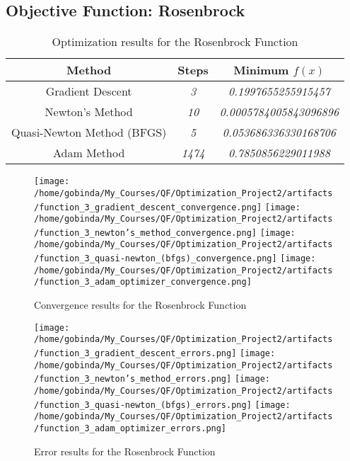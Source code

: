 \documentclass[12pt]{article}
\begin{document}
\subsection*{Objective Function: Rosenbrock}

\begin{table}[htbp]
   \centering
   \small %
   \begin{tabular}{|c|c|c|}
      \hline
      \textbf{Method} & \textbf{Steps} & \textbf{Minimum \( f(x) \)} \\
      \hline
      Gradient Descent & \textit{3} & \textit{0.1997655255915457} \\
      \hline
      Newton's Method & \textit{10} & \textit{0.0005784005843096896} \\
      \hline
      Quasi-Newton Method (BFGS) & \textit{5} & \textit{0.053686336330168706} \\
      \hline
      Adam Method & \textit{1474} & \textit{0.7850856229011988} \\
      \hline
   \end{tabular}
   \caption{\small Optimization results for the Rosenbrock Function}
   \label{tab:rosenbrock_function_results}
\end{table}

\begin{figure}[htbp]
   \centering
   \texttt{[image: /home/gobinda/My\_Courses/QF/Optimization\_Project2/artifacts/function\_3\_gradient\_descent\_convergence.png]}
   \texttt{[image: /home/gobinda/My\_Courses/QF/Optimization\_Project2/artifacts/function\_3\_newton's\_method\_convergence.png]}
   \texttt{[image: /home/gobinda/My\_Courses/QF/Optimization\_Project2/artifacts/function\_3\_quasi-newton\_(bfgs)\_convergence.png]}
   \texttt{[image: /home/gobinda/My\_Courses/QF/Optimization\_Project2/artifacts/function\_3\_adam\_optimizer\_convergence.png]}
   \caption{\small Convergence results for the Rosenbrock Function}
   \label{fig:rosenbrock_function_convergence}
\end{figure}

\begin{figure}[htbp]
   \centering
   \texttt{[image: /home/gobinda/My\_Courses/QF/Optimization\_Project2/artifacts/function\_3\_gradient\_descent\_errors.png]}
   \texttt{[image: /home/gobinda/My\_Courses/QF/Optimization\_Project2/artifacts/function\_3\_newton's\_method\_errors.png]}
   \texttt{[image: /home/gobinda/My\_Courses/QF/Optimization\_Project2/artifacts/function\_3\_quasi-newton\_(bfgs)\_errors.png]}
   \texttt{[image: /home/gobinda/My\_Courses/QF/Optimization\_Project2/artifacts/function\_3\_adam\_optimizer\_errors.png]}
   \caption{\small Error results for the Rosenbrock Function}
   \label{fig:rosenbrock_function_errors}
\end{figure}
\end{document}

